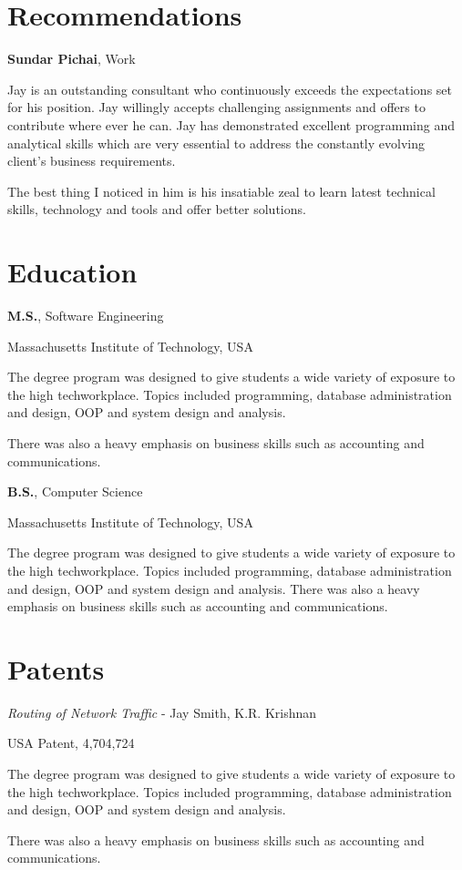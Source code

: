 \documentclass[11pt]{article}
\begin{document}
\section*{Recommendations}
%
\begin{cvitem}%
	\textbf{Sundar Pichai}, Work \par
	Jay is an outstanding consultant who continuously exceeds the expectations set for his position. Jay willingly
    accepts challenging assignments and offers to contribute where ever he can. Jay has demonstrated excellent
    programming and analytical skills which are very essential to address the constantly evolving client's
    business requirements.
	
	The best thing I noticed in him is his insatiable zeal to learn latest technical skills, technology %
    and tools and offer better solutions.
\end{cvitem}%
\section*{Education}
%
\begin{cvitem}
	\textbf{M.S.}, Software Engineering\par
	Massachusetts Institute of Technology, USA \par
	The degree program was designed to give students a wide variety of exposure to the high techworkplace.
    Topics included programming, database administration and design, OOP and system design and analysis.
	
	There was also a heavy emphasis on business skills such as accounting and communications.
    \par
\end{cvitem}%
\begin{cvitem}
	\textbf{B.S.}, Computer Science \par
	Massachusetts Institute of Technology, USA \par
	The degree program was designed to give students a wide variety of exposure to the high techworkplace.
    Topics included programming, database administration and design, OOP and system design and analysis.
    There was also a heavy emphasis on business skills such as accounting and communications.
\end{cvitem}%
\section*{Patents}
%
\begin{cvitem}
	\textit{Routing of Network Traffic} - Jay Smith, K.R. Krishnan \par
	USA Patent, 4,704,724 \par
	The degree program was designed to give students a wide variety of exposure to the high techworkplace.
    Topics
    included programming, database administration and design, OOP and system design and analysis.
	
	There was also a heavy emphasis on business skills such as accounting and communications.
\end{cvitem}%
\end{document}
